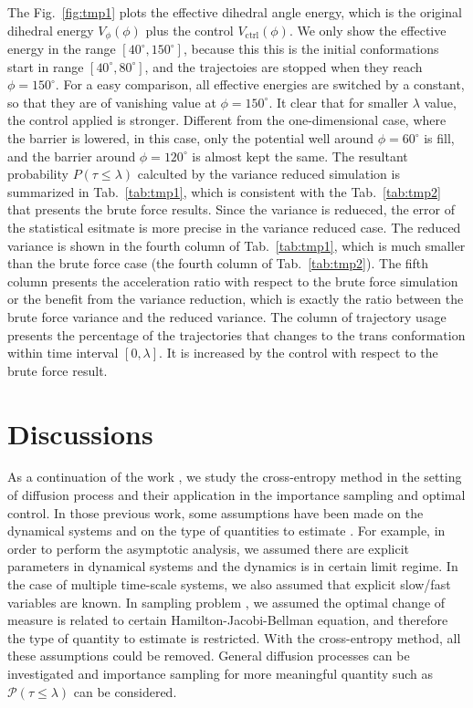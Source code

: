 \documentclass[final]{siamltex}
\begin{document}
The Fig.~\ref{fig:tmp1} plots the effective dihedral angle energy,
which is the original dihedral energy $V_\phi(\phi)$ plus the control
$V_{\textrm{ctrl}}(\phi)$. We only show the effective energy in the
range $[40^\circ, 150^\circ]$, because this this is the initial
conformations start in range $[40^\circ, 80^\circ]$, and the
trajectoies are stopped when they reach $\phi = 150^\circ$. For a easy
comparison, all effective energies are switched by a constant, so that
they are of vanishing value at $\phi = 150^\circ$. It clear that for
smaller $\lambda$ value, the control applied is stronger. Different
from the one-dimensional case, where the barrier is lowered, in this
case, only the potential well around $\phi = 60^\circ$ is fill, and
the barrier around $\phi = 120^\circ$ is almost kept the same.  The
resultant probability $P (\tau \leq \lambda)$ calculted by the
variance reduced simulation is summarized in Tab.~\ref{tab:tmp1},
which is consistent with the Tab.~\ref{tab:tmp2} that presents the
brute force results. Since the variance is redueced, the error of the
statistical esitmate is more precise in the variance reduced case. The
reduced variance is shown in the fourth column of Tab.~\ref{tab:tmp1},
which is much smaller than the brute force case (the fourth column of
Tab.~\ref{tab:tmp2}). The fifth column presents the acceleration ratio
with respect to the brute force simulation or the benefit from the
variance reduction, which is exactly the ratio between the brute force
variance and the reduced variance. The column of trajectory usage
presents the percentage of the trajectories that changes to the trans
conformation within time interval $[0, \lambda]$. It is increased by
the control with respect to the brute force result.




\section{Discussions}
\label{sec-discuss}

As a continuation of the work \cite{zlph2013, zhws13}, we study the cross-entropy
method in the setting of diffusion process and their application in the
importance sampling and optimal control.
In those previous work, some assumptions have been made on the dynamical systems and
on the type of quantities to estimate \cite{zhws13}. For example, 
in order to perform the asymptotic analysis, we assumed there are explicit parameters in dynamical systems and the dynamics
is in certain limit regime. In the case of multiple time-scale systems, we
also assumed that explicit slow/fast variables are known. In sampling problem \cite{zhws13}, we assumed 
the optimal change of measure is related to certain Hamilton-Jacobi-Bellman equation,
and therefore the type of quantity to estimate is restricted. With the
cross-entropy method, all these assumptions could be removed. General
diffusion processes can be investigated and importance sampling for more
meaningful quantity such as $\mathcal{P}(\tau \le \lambda)$ can be considered.
\end{document}
